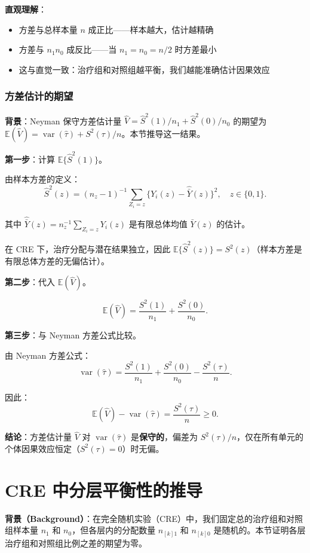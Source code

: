 \textbf{直观理解}：
\begin{itemize}
  \item 方差与总样本量 $n$ 成正比——样本越大，估计越精确
  \item 方差与 $n_1 n_0$ 成反比——当 $n_1 = n_0 = n/2$ 时方差最小
  \item 这与直觉一致：治疗组和对照组越平衡，我们越能准确估计因果效应
\end{itemize}

\subsubsection*{方差估计的期望}\label{sec:appendix-neyman-vhat}
\textbf{背景}：Neyman 保守方差估计量 $\hat{V} = \hat{S}^2(1)/n_1 + \hat{S}^2(0)/n_0$ 的期望为 $\mathbb{E}(\hat{V}) = \operatorname{var}(\hat{\tau}) + S^2(\tau)/n$。本节推导这一结果。

\textbf{第一步}：计算 $\mathbb{E}\{\hat{S}^2(1)\}$。

由样本方差的定义：
\[
\hat{S}^2(z) = (n_z - 1)^{-1} \sum_{Z_i=z} \{Y_i(z) - \hat{\bar{Y}}(z)\}^2, \quad z \in \{0, 1\}.
\]

其中 $\hat{\bar{Y}}(z) = n_z^{-1}\sum_{Z_i=z} Y_i(z)$ 是有限总体均值 $\bar{Y}(z)$ 的估计。

在 CRE 下，治疗分配与潜在结果独立，因此 $\mathbb{E}\{\hat{S}^2(z)\} = S^2(z)$（样本方差是有限总体方差的无偏估计）。

\textbf{第二步}：代入 $\mathbb{E}(\hat{V})$。

\[
\mathbb{E}(\hat{V}) = \frac{S^2(1)}{n_1} + \frac{S^2(0)}{n_0}.
\]

\textbf{第三步}：与 Neyman 方差公式比较。

由 Neyman 方差公式：
\[
\operatorname{var}(\hat{\tau}) = \frac{S^2(1)}{n_1} + \frac{S^2(0)}{n_0} - \frac{S^2(\tau)}{n}.
\]

因此：
\[
\mathbb{E}(\hat{V}) - \operatorname{var}(\hat{\tau}) = \frac{S^2(\tau)}{n} \geq 0.
\]

\textbf{结论}：方差估计量 $\hat{V}$ 对 $\operatorname{var}(\hat{\tau})$ 是\textbf{保守的}，偏差为 $S^2(\tau)/n$，仅在所有单元的个体因果效应恒定（$S^2(\tau) = 0$）时无偏。

\section{CRE 中分层平衡性的推导}\label{sec:appendix-5-cre-balance}\label{sec:appendix-5-condition}

\textbf{背景（Background）}：在完全随机实验（CRE）中，我们固定总的治疗组和对照组样本量 $n_1$ 和 $n_0$，但各层内的分配数量 $n_{[k]1}$ 和 $n_{[k]0}$ 是随机的。本节证明各层治疗组和对照组比例之差的期望为零。

